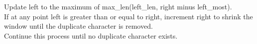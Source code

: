 \documentclass[preview]{standalone}
\begin{document}
Update left to the maximum of max_len(left_len, right minus left_most).\\If at any point left is greater than or equal to right, increment right to shrink the window until the duplicate character is removed.\\Continue this process until no duplicate character exists.\\
\end{document}
